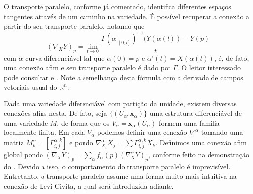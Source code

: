 O transporte paralelo, conforme já comentado, identifica diferentes espaços tangentes através de um caminho na variedade. É possível recuperar a conexão a partir do seu transporte paralelo, notando que
\begin{equation*}
	(\nabla_XY)_{p}=\lim_{ t \to 0 } \frac{\Gamma(\alpha|_{[0,t]})^{-1}(Y(\alpha(t))-Y(p)}{t}
\end{equation*}
com $\alpha$ curva diferenciável tal que $\alpha(0)=p$ e $\alpha'(t)=X(\alpha(t))$, é, de fato, uma conexão afim e seu transporte paralelo é dado por $\Gamma$. O leitor interessado pode consultar \textcite{doCarmo1992} e \textcite{leeRiemannian}.
Note a semelhança desta fórmula com a derivada de campos vetoriais usual do $\mathbb{R}^{n}$.

Dada uma variedade diferenciável com partição da unidade, existem diversas conexões afins nesta. De fato, seja $\{ (U_{\alpha}, \mathbf{x}_{\alpha}) \}$ uma estrutura diferenciável de uma variedade $M$, de forma que os $V_{\alpha}=\mathbf{x}_{\alpha}(U_{\alpha})$ formem uma família localmente finita. Em cada $V_{\alpha}$ podemos definir uma conexão $\nabla^{\alpha}$ tomando uma matriz $M^{\alpha}_{k}=[\Gamma_{i,j}^{\alpha,k}]$ e pondo $\nabla^{\alpha}_{X_{i}}X_{j}=\sum\Gamma_{i,j}^{\alpha,k}X_{k}$. Definimos uma conexão afim global pondo $(\nabla_{X}Y)_{p}=\sum_{\alpha}f_{\alpha}(p)(\nabla_{X}^{\alpha}Y)_{p}$, conforme feito na demonstração do . Devido a isso, o comportamento do transporte paralelo é imprevisível. Entretanto, o transporte paralelo assume uma forma muito mais intuitiva na conexão de Levi-Civita, a qual será introduzida adiante.

